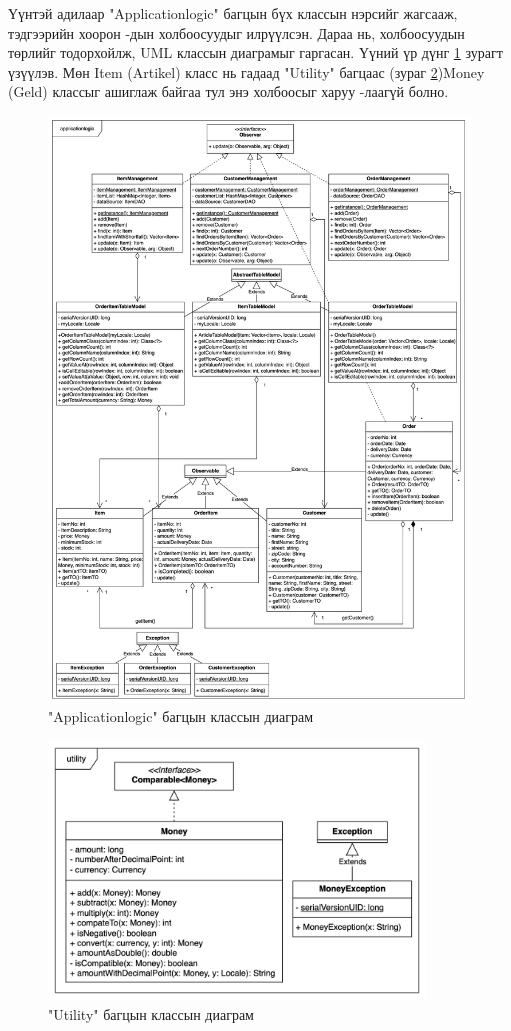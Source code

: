 Үүнтэй адилаар "Applicationlogic" багцын бүх классын нэрсийг жагсааж, тэдгээрийн хоорон -дын холбоосуудыг илрүүлсэн. Дараа нь, холбоосуудын төрлийг тодорхойлж, UML классын диаграмыг гаргасан. Үүний үр дүнг \ref{fig:diagram1} зурагт үзүүлэв. Мөн Item (Artikel) класс нь гадаад "Utility" багцаас (зураг \ref{fig:diagram4})\quad Money (Geld) классыг ашиглаж байгаа тул энэ холбоосыг харуу -лаагүй болно.

\begin{figure}
	\centering
	\includegraphics[width=15cm]{images/diagram1.png}
	\caption{"Applicationlogic" багцын классын диаграм}
	\label{fig:diagram1}
\end{figure}

\begin{figure}
	\centering
	\includegraphics[width=10cm]{images/diagram4.png}
	\caption{"Utility" багцын классын диаграм}
	\label{fig:diagram4}
\end{figure}

